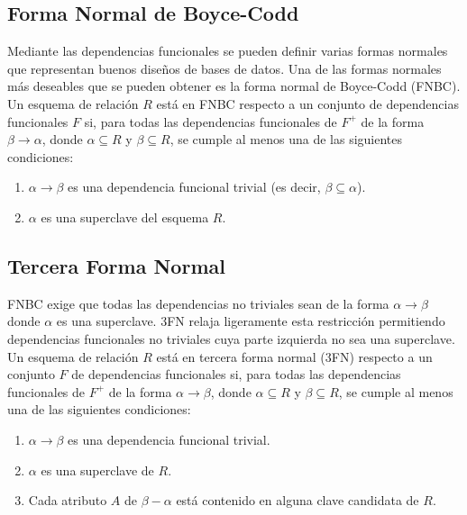 \documentclass[a4paper,12pt]{article}
\begin{document}
\subsection{Forma Normal de Boyce-Codd}

Mediante las dependencias funcionales se pueden definir varias formas normales que representan buenos diseños de bases de datos. Una de las formas normales más deseables que se pueden obtener es la forma normal de Boyce-Codd (FNBC). Un esquema de relación \(R\) está en FNBC respecto a un conjunto de dependencias funcionales \(F\) si, para todas las dependencias funcionales de \(F^+\) de la forma \(\beta \rightarrow \alpha\), donde \(\alpha \subseteq R\) y \(\beta \subseteq R\), se cumple al menos una de las siguientes condiciones:

\begin{enumerate}
    \item \(\alpha \rightarrow \beta\) es una dependencia funcional trivial (es decir, \(\beta \subseteq \alpha\)).
    \item \(\alpha\) es una superclave del esquema \(R\).
\end{enumerate}

\subsection{Tercera Forma Normal}

FNBC exige que todas las dependencias no triviales sean de la forma \(\alpha \rightarrow \beta\) donde \(\alpha\) es una superclave. 3FN relaja ligeramente esta restricción permitiendo dependencias funcionales no triviales cuya parte izquierda no sea una superclave. Un esquema de relación \(R\) está en tercera forma normal (3FN) respecto a un conjunto \(F\) de dependencias funcionales si, para todas las dependencias funcionales de \(F^+\) de la forma \(\alpha \rightarrow \beta\), donde \(\alpha \subseteq R\) y \(\beta \subseteq R\), se cumple al menos una de las siguientes condiciones:

\begin{enumerate}
    \item \(\alpha \rightarrow \beta\) es una dependencia funcional trivial.
    \item \(\alpha\) es una superclave de \(R\).
    \item Cada atributo \(A\) de \(\beta - \alpha\) está contenido en alguna clave candidata de \(R\).
\end{enumerate}
\end{document}
